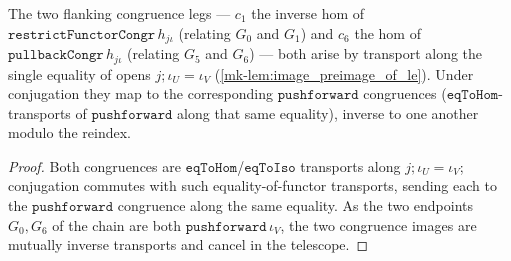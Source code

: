 \begin{lemma}[\(c_1, c_6\): conjugate of the reindex congruences along \(j \mathbin{;} \iota_U = \iota_V\)]\label{mk-lem:conjugateequiv_reindexcongr}
  \leanok

  The two flanking congruence legs --- \(c_1\) the inverse hom of
  \(\mathtt{restrictFunctorCongr}\,h_{j\iota}\) (relating \(G_0\) and \(G_1\)) and \(c_6\) the hom of
  \(\mathtt{pullbackCongr}\,h_{j\iota}\) (relating \(G_5\) and \(G_6\)) --- both arise by transport
  along the single equality of opens \(j \mathbin{;} \iota_U = \iota_V\)
  (\ref{mk-lem:image_preimage_of_le}). Under conjugation they map to the corresponding
  \(\mathtt{pushforward}\) congruences (\(\mathtt{eqToHom}\)-transports of
  \(\mathtt{pushforward}\) along that same equality), inverse to one another modulo the reindex.
\end{lemma}
\begin{proof}
  \leanok
  Both congruences are \(\mathtt{eqToHom}\)/\(\mathtt{eqToIso}\) transports along
  \(j \mathbin{;} \iota_U = \iota_V\); conjugation commutes with such equality-of-functor transports,
  sending each to the \(\mathtt{pushforward}\) congruence along the same equality. As the two
  endpoints \(G_0, G_6\) of the chain are both \(\mathtt{pushforward}\,\iota_V\), the two congruence
  images are mutually inverse transports and cancel in the telescope.
\end{proof}

